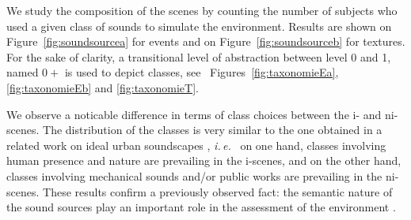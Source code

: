 \documentclass[12pt]{elsarticle}
\newcommand{\ie}{\emph{i.\,e.}}
\newcommand{\cf}{cf.}
\begin{document}

We study the composition of the scenes by counting the number of subjects who used a given class of sounds to simulate the environment. Results are shown on Figure~\ref{fig:soundsourcea} for events and on Figure~\ref{fig:soundsourceb} for textures. For the sake of clarity, a transitional level of abstraction between level 0 and 1, named $0+$ is used to depict classes, see ~Figures~\ref{fig:taxonomieEa}, \ref{fig:taxonomieEb} and \ref{fig:taxonomieT}.


We observe a noticable difference in terms of class choices between the i- and ni-scenes. The distribution of the classes is very similar to the one obtained in a related work on ideal urban soundscapes \cite{guastavino2006ideal}, \ie~ on one hand, classes involving human presence and nature are prevailing in the i-scenes, and on the other hand, classes involving mechanical sounds and/or public works are prevailing in the ni-scenes. These results confirm a previously observed fact: the semantic nature of the sound sources play an important role in the assessment of the environment \cite{raimbault2005urban,dubois2006cognitive}.

\end{document}
